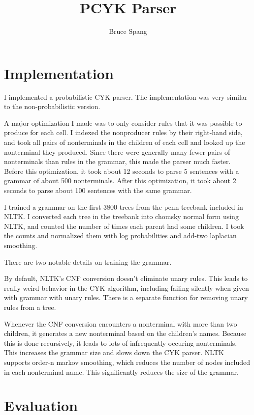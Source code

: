 \documentclass{article}
\begin{document}
\title{PCYK Parser}
\author{Bruce Spang}
\maketitle

\section{Implementation}

I implemented a probabilistic CYK parser. The implementation was very similar to the non-probabilistic version.

A major optimization I made was to only consider rules that it was possible to produce for each cell. I indexed the nonproducer rules by their right-hand side, and took all pairs of nonterminals in the children of each cell and looked up the nonterminal they produced. Since there were generally many fewer pairs of nonterminals than rules in the grammar, this made the parser much faster. Before this optimization, it took about 12 seconds to parse 5 sentences with a grammar of about 500 nonterminals. After this optimization, it took about 2 seconds to parse about 100 sentences with the same grammar.

I trained a grammar on the first 3800 trees from the penn treebank included in NLTK. I converted each tree in the treebank into chomsky normal form using NLTK, and counted the number of times each parent had some children. I took the counts and normalized them with log probabilities and add-two laplacian smoothing.

There are two notable details on training the grammar.

By default, NLTK's CNF conversion doesn't eliminate unary rules. This leads to really weird behavior in the CYK algorithm, including failing silently when given with grammar with unary rules. There is a separate function for removing unary rules from a tree.

Whenever the CNF conversion encounters a nonterminal with more than two children, it generates a new nonterminal based on the children's names. Because this is done recursively, it leads to lots of infrequently occuring nonterminals. This increases the grammar size and slows down the CYK parser. NLTK supports order-n markov smoothing, which reduces the number of nodes included in each nonterminal name. This significantly reduces the size of the grammar.

\pagebreak

\section{Evaluation}
\end{document}
